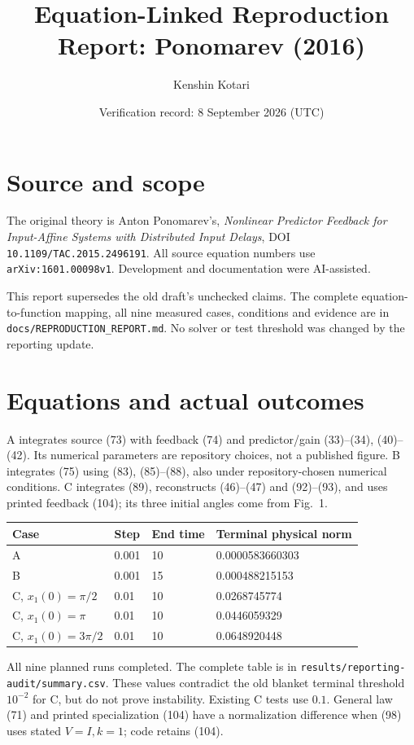 \documentclass[11pt]{article}
\title{Equation-Linked Reproduction Report: Ponomarev (2016)}
\author{Kenshin Kotari}
\date{Verification record: 8 September 2026 (UTC)}
\begin{document}
\maketitle
\section{Source and scope}
The original theory is Anton Ponomarev's, \emph{Nonlinear Predictor Feedback for Input-Affine Systems with Distributed Input Delays}, DOI \texttt{10.1109/TAC.2015.2496191}. All source equation numbers use \texttt{arXiv:1601.00098v1}. Development and documentation were AI-assisted.

This report supersedes the old draft's unchecked claims. The complete equation-to-function mapping, all nine measured cases, conditions and evidence are in \texttt{docs/REPRODUCTION\_REPORT.md}. No solver or test threshold was changed by the reporting update.
\section{Equations and actual outcomes}
A integrates source (73) with feedback (74) and predictor/gain (33)--(34), (40)--(42). Its numerical parameters are repository choices, not a published figure. B integrates (75) using (83), (85)--(88), also under repository-chosen numerical conditions. C integrates (89), reconstructs (46)--(47) and (92)--(93), and uses printed feedback (104); its three initial angles come from Fig.~1.
\begin{center}
\begin{tabular}{llll}
\toprule
Case & Step & End time & Terminal physical norm\\
\midrule
A & 0.001 & 10 & 0.0000583660303\\
B & 0.001 & 15 & 0.000488215153\\
C, $x_1(0)=\pi/2$ & 0.01 & 10 & 0.0268745774\\
C, $x_1(0)=\pi$ & 0.01 & 10 & 0.0446059329\\
C, $x_1(0)=3\pi/2$ & 0.01 & 10 & 0.0648920448\\
\bottomrule
\end{tabular}
\end{center}
All nine planned runs completed. The complete table is in \texttt{results/reporting-audit/summary.csv}. These values contradict the old blanket terminal threshold $10^{-2}$ for C, but do not prove instability. Existing C tests use $0.1$. General law (71) and printed specialization (104) have a normalization difference when (98) uses stated $V=I,k=1$; code retains (104).
\end{document}
